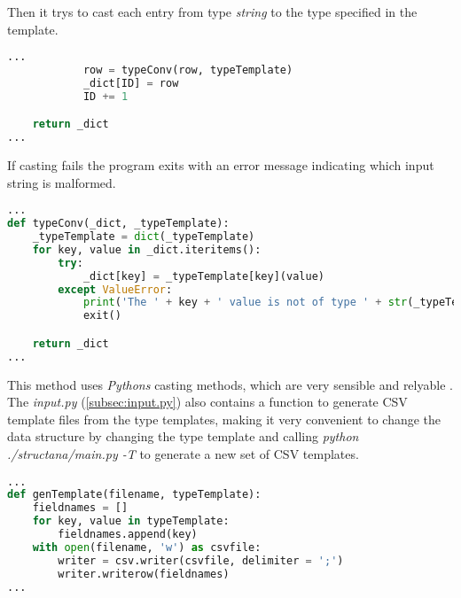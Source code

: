 Then it trys to cast each entry from type \textit{string} to the type specified in the template.

\begin{inconsolata}
\begin{minipage}{\linewidth}
\begin{lstlisting}[language=python]
...
            row = typeConv(row, typeTemplate)
            _dict[ID] = row
            ID += 1

    return _dict
...
\end{lstlisting}
\end{minipage}
\end{inconsolata}

If casting fails the program exits with an error message indicating which input string is malformed.

\begin{inconsolata}
\begin{minipage}{\linewidth}
\begin{lstlisting}[language=python]
...
def typeConv(_dict, _typeTemplate):
    _typeTemplate = dict(_typeTemplate)
    for key, value in _dict.iteritems():
        try:
            _dict[key] = _typeTemplate[key](value)
        except ValueError:
            print('The ' + key + ' value is not of type ' + str(_typeTemplate[key]) + '.')
            exit()

    return _dict
...
\end{lstlisting}
\end{minipage}
\end{inconsolata}

This method uses \textit{Pythons} casting methods, which are very sensible and relyable \cite[2.4.1-2.4.6]{pythonTypes}.
The \textit{input.py} (\cref{subsec:input.py}) also contains a function to generate CSV template files from the type templates, making it very convenient to change the data structure by changing the type template and calling \textit{python ./structana/main.py -T} to generate a new set of CSV templates.

\begin{inconsolata}
\begin{minipage}{\linewidth}
\begin{lstlisting}[language=python]
...
def genTemplate(filename, typeTemplate):
    fieldnames = []
    for key, value in typeTemplate:
        fieldnames.append(key)
    with open(filename, 'w') as csvfile:
        writer = csv.writer(csvfile, delimiter = ';')
        writer.writerow(fieldnames)
...
\end{lstlisting}
\end{minipage}
\end{inconsolata}

